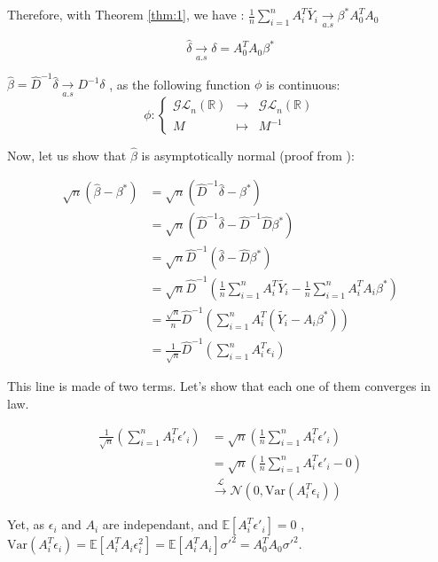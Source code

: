 Therefore, with Theorem \ref{thm:1}, we have :  $\frac{1}{n} \sum_{i=1}^{n} A_i ^T \tilde{Y_i} \underset{a.s}{\rightarrow}  \beta ^*  A_0 ^T A_0 $

\[
\hat{\delta}   \underset{a.s}{\rightarrow}  \delta = A_0 ^T A_0 \beta^*
\] 

$ \hat{\beta} = \hat{D}^{-1} \hat{\delta}  \underset{a.s}{\rightarrow}  D^{-1} \delta $ , as the following function $\phi$ is continuous:
\[
\phi: \left\{
\begin{array}{rcl}
\mathcal{GL}_n(\mathbb{R}) & \to & \mathcal{GL}_n(\mathbb{R}) \\
M & \mapsto & M^{-1}
\end{array}
\right.
\]


Now, let us show that $\hat{\beta}$ is asymptotically normal (proof from \cite{powellasymptoticsforleastsquares}): 

\begin{align*}
    \sqrt{n} ( \hat{\beta} - \beta ^* ) &= \sqrt{n} (\hat{D}^{-1} \hat{\delta} - \beta ^* ) \\
     &= \sqrt{n} (\hat{D}^{-1} \hat{\delta} - \hat{D}^{-1} \hat{D} \beta ^* ) \\
     &= \sqrt{n} \hat{D}^{-1} (\hat{\delta} -  \hat{D} \beta ^* )  \\
     &= \sqrt{n} \hat{D}^{-1} \left( \frac{1}{n} \sum_{i=1}^{n} A_i ^T \tilde{Y_i} - \frac{1}{n}  \sum_{i=1}^{n}  A_i ^T A_i \beta ^* \right)  \\
     &= \frac{\sqrt{n}}{n} \hat{D}^{-1} \left( \sum_{i=1}^{n} A_i ^T (\tilde{Y_i} -    A_i \beta ^* ) \right)   \\
     &= \frac{1}{\sqrt{n}}  \hat{D} ^{-1} \left( \sum_{i=1}^{n}  A_i ^T \epsilon _ i \right)  
\end{align*}

This line is made of two terms. Let's show that each one of them converges in law. 

\begin{align*}
    \frac{1}{\sqrt{n}} \left( \sum_{i=1}^{n}  A_i^T \epsilon'_i \right) &= \sqrt{n} \left( \frac{1}{n} \sum_{i=1}^{n}  A_i^T \epsilon'_i \right) \\
    &= \sqrt{n} \left( \frac{1}{n} \sum_{i=1}^{n}  A_i^T \epsilon'_i - 0 \right) \\
    &\xrightarrow{\mathcal{L}} \mathcal{N}(0, \text{Var}(A_i^T \epsilon_i) )
\end{align*}


Yet, as $\epsilon_i $ and $  A_i $ are independant, and $\mathbb{E} [ A_i^T \epsilon'_i] = 0 $ , $\text{Var}(A_i^T \epsilon_i) = \mathbb{E}[A_i ^T A_i \epsilon_i ^2 ] = \mathbb{E} [ A_i ^T A_i ] \sigma'^2 =A_0^T A_0 \sigma'^2  $. 

